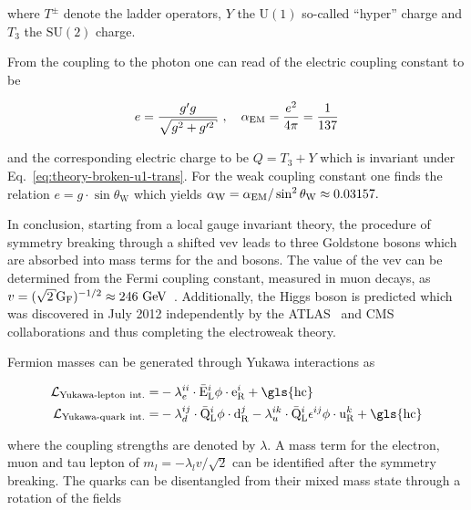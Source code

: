 where $T^{\pm}$ denote the ladder operators, $Y$ the $\mathrm{U(1)}$ so-called ``hyper'' charge and $T_3$ the $\mathrm{SU(2)}$ charge.

From the coupling to the photon one can read of the electric coupling constant to be 

\begin{equation}
e=\frac{g^{\prime} g}{\sqrt{g^2+g^{\prime 2}}}~,\quad \aem=\frac{e^2}{4\pi}=\frac{1}{137}
\end{equation}

and the corresponding electric charge to be $Q=T_3+Y$ which is invariant under Eq.~\ref{eq:theory-broken-u1-trans}. For the weak coupling constant one finds the relation $e=g\cdot\sin\theta_\mathrm{W}$ which yields ${\alpha_\mathrm{W}}={\alpha_\mathrm{EM}}/\sin^2\theta_\mathrm{W}\approx0.03157.$

In conclusion, starting from a local gauge invariant theory, the procedure of symmetry breaking through a shifted \gls{vev} leads to three Goldstone bosons which are absorbed into mass terms for the \wboson and \zboson bosons. The value of the \gls{vev} can be determined from the Fermi coupling constant, measured in muon decays, as $v = (\sqrt{2}\mathrm{G_{F}})^{-1/2}\approx 246~\GeV$~\cite{PhysRevLett.106.041803}. Additionally, the Higgs boson is predicted which was discovered in July 2012 independently by the ATLAS~\cite{Aad:2012tfa} and CMS~\cite{Chatrchyan:2012xdj} collaborations and thus completing the electroweak theory.


Fermion masses can be generated through Yukawa interactions as

\begin{align}
\mathcal{L}_\mathrm{Yukawa\text{-}lepton~int.}=&-\lambda_{e}^{ii}\cdot\bar{\mathrm{E}}^{i}_\mathrm{L}\phi\cdot\mathrm{e}^{i}_\mathrm{R}+\mathrm{\gls{hc}} \label{eq:theory-lepton-yukawa}\\
\mathcal{L}_\mathrm{Yukawa\text{-}quark~int.}=&-\lambda_{d}^{ij}\cdot\bar{\mathrm{Q}}^{i}_\mathrm{L}\phi\cdot\mathrm{d}^{j}_\mathrm{R}-\lambda_{u}^{ik}\cdot\bar{\mathrm{Q}}^{i}_\mathrm{L}\epsilon^{ij}\phi\cdot\mathrm{u}^{k}_\mathrm{R} +\mathrm{\gls{hc}} \label{eq:theory-quark-yukawa}
\end{align}

where the coupling strengths are denoted by $\lambda$. A mass term for the electron, muon and tau lepton of $m_l=-\lambda_l v/\sqrt{2}$ can be identified after the symmetry breaking. The quarks can be disentangled from their mixed mass state through a rotation of the fields 


